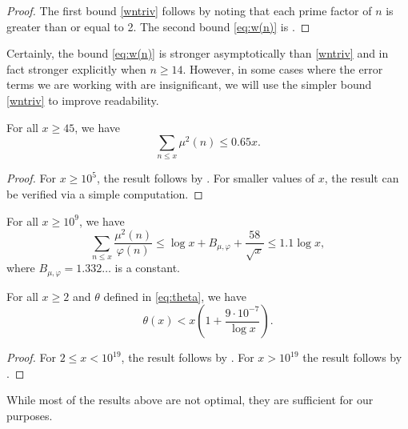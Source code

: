 \documentclass[12pt]{amsart}
\begin{document}
\begin{proof}
    The first bound \eqref{wntriv} follows by noting that each prime factor of $n$ is greater than or equal to 2. The second bound \eqref{eq:w(n)} is \cite[Theorem 11]{Guy}.
\end{proof}
Certainly, the bound \eqref{eq:w(n)} is stronger asymptotically than \eqref{wntriv} and in fact stronger explicitly when $n\ge 14$. However, in some cases where the error terms we are working with are insignificant, we will use the simpler bound \eqref{wntriv} to improve readability. 
\begin{lemma}\label{squarefreelem}
    For all $x\ge 45$, we have
    \begin{equation}\label{squarefreeeq}
        \sum_{n\le x}\mu^2(n)\le 0.65x.
    \end{equation}
\end{lemma}
\begin{proof}
    For $x\ge 10^5$, the result follows by \cite[(4.6)]{Buthe1}. For smaller values of $x$, the result can be verified via a simple computation.
\end{proof}
\begin{lemma}\label{muphilem}
    For all $x\ge 10^9$, we have
    \begin{equation*}
        \sum_{n\le x}\frac{\mu^2(n)}{\varphi(n)}\le\log x + B_{\mu, \varphi} +\frac{58}{\sqrt{x}}\le 1.1\log x,
    \end{equation*}
    where $B_{\mu, \varphi}=1.332\ldots$ is a constant.
\end{lemma}
\begin{lemma}\label{thetauplem}
    For all $x\ge 2$ and $\theta$ defined in \eqref{eq:theta}, we have
    \begin{equation*}
        \theta(x)<x\left(1+\frac{9\cdot 10^{-7}}{\log x}\right).
    \end{equation*}
\end{lemma}
\begin{proof}
    For $2\le x< 10^{19}$, the result follows by \cite[Theorem 2]{Buthe3}. For $x>10^{19}$ the result follows by \cite[Table 15]{Broad}.
\end{proof}
While most of the results above are not optimal, they are sufficient for our purposes.
\end{document}

